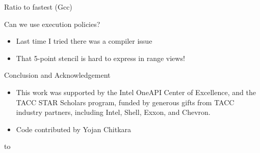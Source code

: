\documentclass[10pt]{beamer}
\begin{document}
\begin{frame}[containsverbatim]{Ratio to fastest (Gcc)}
  
\end{frame}

\begin{frame}[containsverbatim]{Can we use execution policies?}
  \begin{itemize}
  \item Last time I tried there was a compiler issue
  \item That 5-point stencil is hard to express in range views!
  \end{itemize}
\end{frame}

\begin{frame}[containsverbatim]{Conclusion and Acknowledgement}
  \begin{itemize}
  \item This work was supported by
    the Intel OneAPI Center of Excellence, and the 
    TACC STAR Scholars program,
    funded by generous gifts from TACC industry partners, including Intel, Shell, Exxon,
    and Chevron.
  \item Code contributed by Yojan Chitkara
  \end{itemize}
  \hbox to 
\end{frame}
\end{document}
